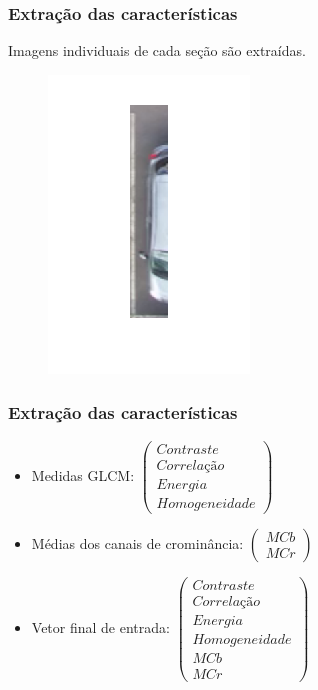 \documentclass{beamer}
\begin{document}
\begin{frame}
\frametitle{Extração das características}
Imagens individuais de cada seção são extraídas.
\begin{figure}
	\centering
	\includegraphics[width=.4\textwidth]{imgSecao}
	\centering
\end{figure}
\end{frame}

\begin{frame}
\frametitle{Extração das características}
\begin{itemize}
\item Medidas GLCM: $\begin{pmatrix}
	Contraste\\Correlação\\Energia\\Homogeneidade
	\end{pmatrix}$
\item Médias dos canais de crominância: $\begin{pmatrix}
	MCb\\MCr
	\end{pmatrix}$
\item Vetor final de entrada: $\begin{pmatrix}
	Contraste\\Correlação\\Energia\\Homogeneidade\\MCb\\MCr
	\end{pmatrix}$
\end{itemize}

\end{frame}
\end{document}
